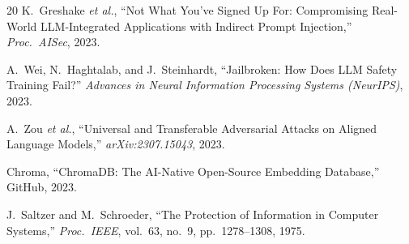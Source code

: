 \documentclass[conference]{IEEEtran}
\begin{document}
\begin{thebibliography}{20}
K.~Greshake \textit{et al.}, ``Not What You've Signed Up For:
Compromising Real-World LLM-Integrated Applications with Indirect
Prompt Injection,'' \textit{Proc.\ AISec}, 2023.

A.~Wei, N.~Haghtalab, and J.~Steinhardt, ``Jailbroken: How Does
LLM Safety Training Fail?'' \textit{Advances in Neural Information
Processing Systems (NeurIPS)}, 2023.

A.~Zou \textit{et al.}, ``Universal and Transferable Adversarial
Attacks on Aligned Language Models,'' \textit{arXiv:2307.15043},
2023.

Chroma, ``ChromaDB: The AI-Native Open-Source Embedding Database,''
GitHub, 2023.

J.~Saltzer and M.~Schroeder, ``The Protection of Information in
Computer Systems,'' \textit{Proc.\ IEEE}, vol.~63, no.~9,
pp.~1278--1308, 1975.

\end{thebibliography}
\end{document}
